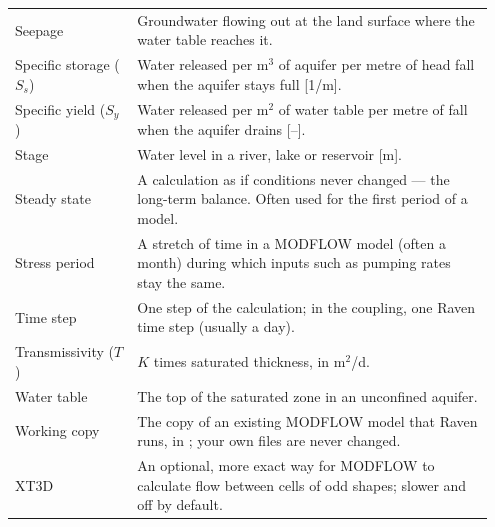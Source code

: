 \begin{longtable}{P{0.24\linewidth}P{0.708\linewidth}}
Seepage & Groundwater flowing out at the land surface where the water table reaches it.\\
Specific storage ($S_s$) & Water released per m$^3$ of aquifer per metre of head fall when the aquifer stays full [1/m].\\
Specific yield ($S_y$) & Water released per m$^2$ of water table per metre of fall when the aquifer drains [--].\\
Stage & Water level in a river, lake or reservoir [m].\\
Steady state & A calculation as if conditions never changed --- the long-term balance. Often used for the first period of a model.\\
Stress period & A stretch of time in a MODFLOW model (often a month) during which inputs such as pumping rates stay the same.\\
Time step & One step of the calculation; in the coupling, one Raven time step (usually a day).\\
Transmissivity ($T$) & $K$ times saturated thickness, in m$^2$/d.\\
Water table & The top of the saturated zone in an unconfined aquifer.\\
Working copy & The copy of an existing MODFLOW model that Raven runs, in ; your own files are never changed.\\
XT3D & An optional, more exact way for MODFLOW to calculate flow between cells of odd shapes; slower and off by default.\\\bottomrule
\end{longtable}
